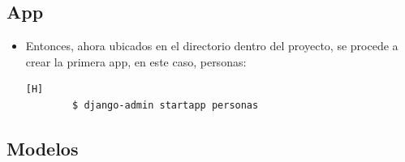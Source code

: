 \documentclass{article}
\begin{document}
        \subsection{App}
        \begin{itemize}
            \item Entonces, ahora ubicados en el directorio dentro del proyecto, se procede a crear la primera app, en este caso, personas:        


        \begin{lstlisting}[language=bash,caption={Comando para crear la app personas}][H]
        $ django-admin startapp personas
            \end{lstlisting}
        \end{itemize}
        \subsection{Modelos}
\end{document}
